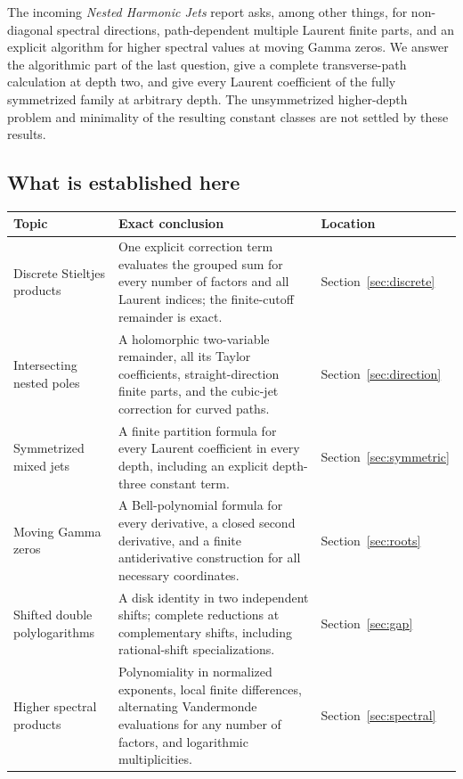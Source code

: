 \documentclass[11pt,letterpaper]{article}
\numberwithin{equation}{section}
\theoremstyle{plain}
\theoremstyle{definition}
\theoremstyle{remark}
\begin{document}
The incoming \emph{Nested Harmonic Jets} report asks, among other things,
for non-diagonal spectral directions, path-dependent multiple Laurent
finite parts, and an explicit algorithm for higher spectral values at
moving Gamma zeros. We answer the algorithmic part of the last question,
give a complete transverse-path calculation at depth two, and give every
Laurent coefficient of the fully symmetrized family at arbitrary depth.
The unsymmetrized higher-depth problem and minimality of the resulting
constant classes are not settled by these results.

\subsection{What is established here}

\begin{longtable}{@{}>{\raggedright\arraybackslash}p{}>{\raggedright\arraybackslash}p{}>{\raggedright\arraybackslash}p{}@{}}
\toprule Topic & Exact conclusion & Location\\\midrule
\endhead
Discrete Stieltjes products & One explicit correction term evaluates the
grouped sum for every number of factors and all Laurent indices; the
finite-cutoff remainder is exact. & Section~\ref{sec:discrete}\\[4pt]
Intersecting nested poles & A holomorphic two-variable remainder, all its
Taylor coefficients, straight-direction finite parts, and the cubic-jet
correction for curved paths. & Section~\ref{sec:direction}\\[4pt]
Symmetrized mixed jets & A finite partition formula for every Laurent
coefficient in every depth, including an explicit depth-three constant
term. & Section~\ref{sec:symmetric}\\[4pt]
Moving Gamma zeros & A Bell-polynomial formula for every derivative, a
closed second derivative, and a finite antiderivative construction for
all necessary coordinates. & Section~\ref{sec:roots}\\[4pt]
Shifted double polylogarithms & A disk identity in two independent shifts;
complete reductions at complementary shifts, including rational-shift
specializations. & Section~\ref{sec:gap}\\[4pt]
Higher spectral products & Polynomiality in normalized exponents, local
finite differences, alternating Vandermonde evaluations for any number
of factors, and logarithmic multiplicities. & Section~\ref{sec:spectral}\\
\bottomrule
\end{longtable}
\end{document}
